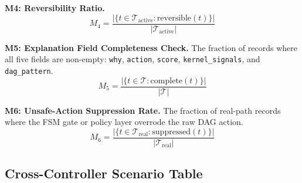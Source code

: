 \documentclass[conference]{IEEEtran}
\begin{document}
\textbf{M4: Reversibility Ratio.}
\begin{equation}
M_4 = \frac{|\{t \in \mathcal{T}_{\mathrm{active}} : \mathrm{reversible}(t)\}|}{|\mathcal{T}_{\mathrm{active}}|}
\label{eq:M4}
\end{equation}

\textbf{M5: Explanation Field Completeness Check.} The fraction of records where all five fields are non-empty: \texttt{why}, \texttt{action}, \texttt{score}, \texttt{kernel\_signals}, and \texttt{dag\_pattern}.
\begin{equation}
M_5 = \frac{|\{t \in \mathcal{T} : \mathrm{complete}(t)\}|}{|\mathcal{T}|}
\label{eq:M5}
\end{equation}

\textbf{M6: Unsafe-Action Suppression Rate.} The fraction of real-path records where the FSM gate or policy layer overrode the raw DAG action.
\begin{equation}
M_6 = \frac{|\{t \in \mathcal{T}_{\mathrm{real}} : \mathrm{suppressed}(t)\}|}{|\mathcal{T}_{\mathrm{real}}|}
\label{eq:M6}
\end{equation}

\subsection{Cross-Controller Scenario Table}
\end{document}
